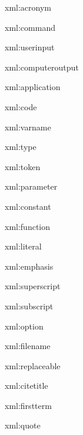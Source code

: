 
\startxmlsetups xml:acronym
	{}
\stopxmlsetups

\startxmlsetups xml:command
	{\tt {}}
\stopxmlsetups

\startxmlsetups xml:userinput
	{\tt {}}
\stopxmlsetups

\startxmlsetups xml:computeroutput
	{\tt {}}
\stopxmlsetups

\startxmlsetups xml:application
\stopxmlsetups

\startxmlsetups xml:code
	{\tt {}}
\stopxmlsetups

\startxmlsetups xml:varname
	{\tt {}}
\stopxmlsetups

\startxmlsetups xml:type
	{\tt {}}
\stopxmlsetups

\startxmlsetups xml:token
	{\tt {}}
\stopxmlsetups

\startxmlsetups xml:parameter
	{\tt {}}
\stopxmlsetups

\startxmlsetups xml:constant
	{\tt {}}
\stopxmlsetups

\startxmlsetups xml:function
	{\tt {}}
\stopxmlsetups

\startxmlsetups xml:literal
	{\tt {}}
\stopxmlsetups

\startxmlsetups xml:emphasis
	{\em {}}
\stopxmlsetups

\startxmlsetups xml:superscript
\stopxmlsetups

\startxmlsetups xml:subscript
\stopxmlsetups

\startxmlsetups xml:option
	{\tt {}}
\stopxmlsetups

\startxmlsetups xml:filename
	{\tt {}}
\stopxmlsetups

\startxmlsetups xml:replaceable
	{\it {}}
\stopxmlsetups

\startxmlsetups xml:citetitle
	{\it {}}
\stopxmlsetups

\startxmlsetups xml:firstterm
	{\it {}}
\stopxmlsetups

\startxmlsetups xml:quote
\stopxmlsetups

